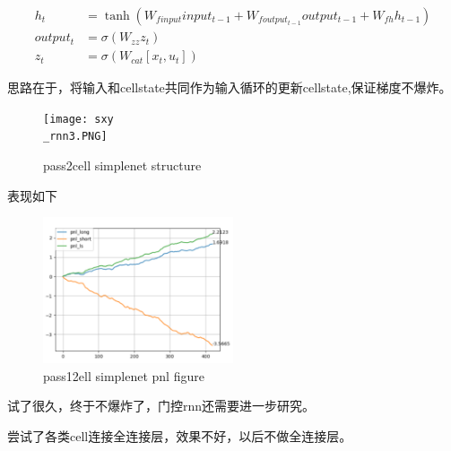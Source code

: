 \documentclass[11pt]{ctexart}
\begin{document}
\begin{equation}
\begin{split}
    h_t &= \tanh(W_{f input} input_{t-1} + W_{f output_{t-1}} output_{t-1} + W_{f h} h_{t-1})\\
    output_t &= \sigma(W_{z z} z_t)\\
    z_t &= \sigma(W_{cat} [x_t, u_t])
\end{split}
\end{equation}

思路在于，将输入和cellstate共同作为输入循环的更新cellstate,保证梯度不爆炸。
\begin{figure}[!ht]
\begin{center}
\texttt{[image: sxy\\\_rnn3.PNG]}
\end{center}
\caption{pass2cell simplenet structure}
\label{FIG.9}
\end{figure}
表现如下
\begin{figure}[!ht]
\begin{center}
\includegraphics[width=0.5\textwidth]{wwd.PNG}
\end{center}
\caption{pass12ell simplenet pnl figure}
\label{FIG.10}
\end{figure}

试了很久，终于不爆炸了，门控rnn还需要进一步研究。

尝试了各类cell连接全连接层，效果不好，以后不做全连接层。
\end{document}
